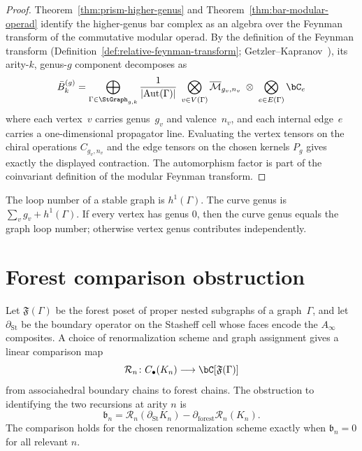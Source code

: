 \begin{proof}
Theorem~\ref{thm:prism-higher-genus} and
Theorem~\ref{thm:bar-modular-operad} identify the higher-genus bar
complex as an algebra over the Feynman transform of the commutative
modular operad.  By the definition of the Feynman transform
\textup{(}Definition~\textup{\ref{def:relative-feynman-transform}};
Getzler--Kapranov~\cite{GeK98}\textup{)}, its arity-\(k\), genus-\(g\)
component decomposes as
\[
\bar{B}^{(g)}_k = \bigoplus_{\Gamma \in \StGraph_{g,k}}
\frac{1}{|\mathrm{Aut}(\Gamma)|}\;
\bigotimes_{v \in V(\Gamma)}
\overline{\mathcal{M}}_{g_v, n_v}
\;\otimes\; \bigotimes_{e \in E(\Gamma)} \bC_e
\]
where each vertex~$v$ carries genus~$g_v$ and valence~$n_v$, and each
internal edge~$e$ carries a one-dimensional propagator line.  Evaluating
the vertex tensors on the chiral operations \(C_{g_v,n_v}\) and the
edge tensors on the chosen kernels \(P_g\) gives exactly the displayed
contraction.  The automorphism factor is part of the coinvariant
definition of the modular Feynman transform.
\end{proof}

\begin{remark}
The loop number of a stable graph is \(h^1(\Gamma)\).  The curve genus
is \(\sum_v g_v+h^1(\Gamma)\).  If every vertex has genus \(0\), then
the curve genus equals the graph loop number; otherwise vertex genus
contributes independently.
\end{remark}

\section{Forest comparison obstruction}
\label{sec:bphz-ainfinity}

\begin{definition}
\label{def:bphz-comparison-obstruction}
Let \(\mathfrak F(\Gamma)\) be the forest poset of proper nested
subgraphs of a graph~\(\Gamma\), and let
\(\partial_{\mathrm{St}}\) be the boundary operator on the Stasheff
cell whose faces encode the \(A_\infty\) composites.  A choice of
renormalization scheme and graph assignment gives a linear comparison
map
\[
\mathcal R_n\colon C_\bullet(K_n)\longrightarrow
\bC[\mathfrak F(\Gamma)]
\]
from associahedral boundary chains to forest chains.  The obstruction
to identifying the two recursions at arity \(n\) is
\[
\mathfrak b_n
=\mathcal R_n(\partial_{\mathrm{St}}K_n)
-\partial_{\mathrm{forest}}\mathcal R_n(K_n).
\]
The comparison holds for the chosen renormalization scheme exactly when
\(\mathfrak b_n=0\) for all relevant \(n\).
\end{definition}

